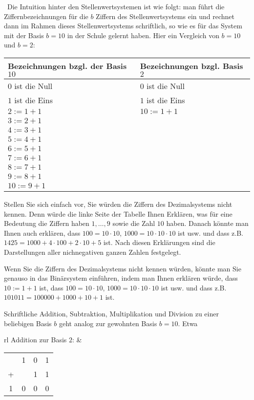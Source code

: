 \begin{bem}\
	Die Intuition hinter den Stellenwertsystemen ist wie folgt: man führt die Ziffernbezeichnungen für die $b$ Ziffern des Stellenwertsystems ein und rechnet dann im Rahmen dieses Stellenwertsystems schriftlich, so wie es für das System mit der Basis $b=10$ in der Schule gelernt haben. Hier ein Vergleich von $b=10$ und $b=2$: 
	\begin{center} 
		\begin{tabular}{l|l} 
			Bezeichnungen bzgl. der Basis $10$ & Bezeichnungen bzgl. Basis $2$ 
			\\ \hline $0$ ist die Null & $0$ ist die Null
			\\ $1$ ist die Eins & $1$ ist die Eins
			\\ $2:=1+1$ & $10:=1+1$
			\\ $3:=2+1$ & 
			\\ $4:=3+1$ & 
			\\ $5:=4+1$ & 
			\\ $6:=5+1$ & 
			\\ $7:= 6+1$ & 
			\\ $8:=7+1$ & 
			\\ $9:=8+1$ & 
			\\ $10:=9+1$  
		\end{tabular} 
	\end{center} 
	Stellen Sie sich einfach vor, Sie würden die Ziffern des Dezimalsystems nicht kennen. Denn würde die linke Seite der Tabelle Ihnen Erklären, was für eine Bedeutung die Ziffern haben $1,\ldots,9$ sowie die Zahl $10$ haben. Danach könnte man Ihnen auch erklären, dass $100 = 10 \cdot 10$, $1000 = 10 \cdot 10 \cdot 10$ ist usw. und dass z.B. $1425 = 1000 + 4 \cdot 100 + 2 \cdot 10 + 5$ ist. Nach diesen Erklärungen sind die Darstellungen aller nichnegativen ganzen Zahlen festgelegt. 
	
	Wenn Sie die Ziffern des Dezimalsystems nicht kennen würden, könnte man Sie genauso in das Binärsystem einführen, indem man Ihnen erklären würde, dass $10:=1+1$ ist, dass $100 = 10 \cdot 10$, $1000 = 10 \cdot 10 \cdot 10$ ist usw. und dass z.B. $101011= 100000 + 1000 + 10 + 1$ ist. 
\end{bem} 


\begin{bsp}
	Schriftliche Addition, Subtraktion, Multiplikation und Division zu einer beliebigen Basis $b$ geht analog zur gewohnten Basis $b=10$. Etwa
	\begin{center}
		\begin{tabular}{rl}
			Addition zur Basis $2$:\hspace{3em} &
			\begin{tabular}{cccc}
				& 1 & 0 & 1
				\\	+ & & 1 & 1
				\\ \hline
				1 & 0 & 0 & 0
			\end{tabular}
		\end{tabular}
	\end{center}
\end{bsp}


